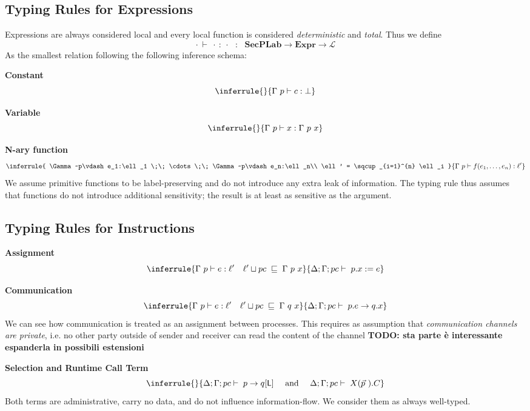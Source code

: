 \documentclass[12pt,a4paper,twoside]{book}
\newcommand{\MCL}{\mathscr{L}}
\begin{document}
\subsection{Typing Rules for Expressions}
Expressions are always considered local and every local function is considered \textit{deterministic} and \textit{total}. Thus we define
$$ \cdot ~\vdash~ \cdot~:~\cdot ~~~:~~~ \textbf{SecPLab} \rightarrow \textbf{Expr} \rightarrow \MCL $$
As the smallest relation following the following inference schema:

\medskip
\noindent\textbf{Constant}
\[
  \inferrule{}
  {\Gamma~p \vdash c : \bot}
\]

\medskip
\noindent\textbf{Variable}
\[
  \inferrule{}
  {\Gamma~p \vdash x : \Gamma~p~x}
\]

\medskip
\noindent\textbf{N-ary function}
\[
\inferrule{
  \Gamma~p\vdash e_1:\ell_1 \;\; \cdots \;\; \Gamma~p\vdash e_n:\ell_n\\
  \ell' = \sqcup_{i=1}^{n} \ell_i
}{
  \Gamma~p\vdash f(e_1,\dots,e_n):\ell'
}
\]
We assume primitive functions to be label-preserving and do not introduce any extra leak of information.
The typing rule thus assumes that functions do not introduce additional sensitivity; the result is at least as sensitive as the argument.

\subsection{Typing Rules for Instructions}
\medskip
\noindent\textbf{Assignment}
\[
  \inferrule
  {\Gamma~p \vdash e : \ell' \quad \ell' \sqcup pc \;\sqsubseteq\; \Gamma~p~x}
  {\Delta;\Gamma;pc \vdash \; p.x := e}
\]

\medskip
\noindent\textbf{Communication}
\[
  \inferrule
  {\Gamma~p \vdash e : \ell' \quad \ell' \sqcup pc \;\sqsubseteq\; \Gamma~q~x}
  {\Delta;\Gamma;pc \vdash \; p.e \to q.x}
\]
We can see how communication is treated as an assignment between processes. This requires as assumption that \textit{communication channels are private}, i.e. no other party outside of sender and receiver can read the content of the channel \textbf{TODO: sta parte è interessante espanderla in possibili estensioni}

\medskip
\noindent\textbf{Selection and Runtime Call Term}
\[
	\inferrule{}{
	\Delta;\Gamma;pc \vdash \; p \to q[\mathsf{L}]
    \quad\text{ and }\quad
    \Delta;\Gamma;pc \vdash \; X(\vec{p}~).C
  }
\]
Both terms are administrative, carry no data, and do not influence information-flow. We consider them as always well-typed.
\end{document}
